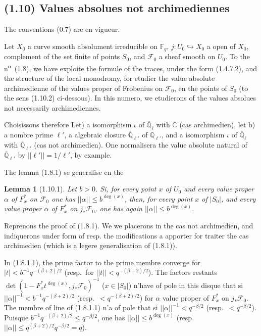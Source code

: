 \documentclass[12pt,a4paper]{article}
\theoremstyle{plain}
\newtheorem{lemma}[theorem]{Lemma}
\theoremstyle{definition}
\theoremstyle{definition}
\theoremstyle{remark}
\begin{document}
\newpage

\subsection*{(1.10) Values absolues not archimediennes}

The conventions (0.7) are en vigueur.

Let $X_0$ a curve smooth absolument irreducible on $\mathbb{F}_q$, $j: U_0 \hookrightarrow X_0$ a open of $X_0$, complement of the set finite of points $S_0$, and $\mathscr{F}_0$ a sheaf smooth on $U_0$. To the n\textsuperscript{o}~(1.8), we have exploite the formule of the traces, under the form (1.4.7.2), and the structure of the local monodromy, for etudier the value absolute archimedienne of the values proper of Frobenius on $\mathscr{F}_0$, en the points of $S_0$ (to the sens (1.10.2) ci-dessous). In this numero, we etudierons of the values absolues not necessarily archimediennes.

Choisissons therefore Let) a isomorphism $\iota$ of $\overline{\mathbb{Q}}_\ell$ with $\mathbb{C}$ (cas archimedien), let b) a nombre prime $\ell'$, a algebraic closure $\overline{\mathbb{Q}}_{\ell'}$ of $\mathbb{Q}_{\ell'}$, and a isomorphism $\iota$ of $\overline{\mathbb{Q}}_\ell$ with $\overline{\mathbb{Q}}_{\ell'}$ (cas not archimedien). One normalisera the value absolute natural of $\overline{\mathbb{Q}}_{\ell'}$ by $||\ell'|| = 1/\ell'$, by example.

The lemma (1.8.1) se generalise en the

\begin{lemma}[1.10.1]
Let $b > 0$. Si, for every point $x$ of $U_0$ and every value proper $\alpha$ of $F_x^*$ on $\mathscr{F}_0$ one has $||\alpha|| \leq b^{\deg(x)}$, then, for every point $x$ of $|S_0|$, and every value proper $\alpha$ of $F_x^*$ on $j_* \mathscr{F}_0$, one has again $||\alpha|| \leq b^{\deg(x)}$.
\end{lemma}

Reprenons the proof of (1.8.1). We we placerons in the cas not archimedien, and indiquerons under form of resp. the modifications a apporter for traiter the cas archimedien (which is a legere generalisation of (1.8.1)).

In (1.8.1.1), the prime factor to the prime membre converge for $|t| < b^{-1} q^{-(\beta+2)/2}$ (resp.~for $||t|| < q^{-(\beta+2)/2}$). The factors restants $\det(1 - F_x^* t^{\deg(x)}, j_* \mathscr{F}_0)^{-1}$ ($x \in |S_0|$) n'have of pole in this disque that si $||\alpha||^{-1} < b^{-1} q^{-(\beta+2)/2}$ (resp.~$< q^{-(\beta+2)/2}$) for $\alpha$ value proper of $F_x^*$ on $j_* \mathscr{F}_0$. The membre of line of (1.8.1.1) n'a of pole that si $||\alpha||^{-1} < q^{-\beta/2}$ (resp.~$< q^{-\beta/2}$). Puisque $b^{-1} q^{-(\beta+2)/2} \leq q^{-\beta/2}$, one has $||\alpha|| \leq b^{\deg(x)}$ (resp.~$||\alpha|| \leq q^{(\beta+2)/2} q^{-\beta/2} = q$).
\end{document}
